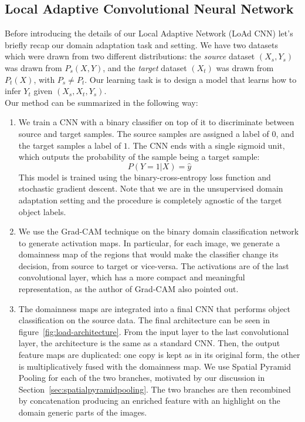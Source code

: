 \documentclass[../main.tex]{subfiles}
\begin{document}
    \subsection{Local Adaptive Convolutional Neural Network}
    Before introducing the details of our Local Adaptive Network (LoAd CNN) let's briefly recap our domain adaptation task and setting.
    We have two datasets which were drawn
    from two different distributions: the \textit{source} dataset $(X_{s}, Y_{s})$ was drawn from $P_{s}(X, Y)$, and the \textit{target}
    dataset $(X_{t})$ was drawn from $P_{t}(X)$, with $P_{s} \neq P_{t}$. Our learning task is to design a model that learns how to infer
    $Y_{t}$ given $(X_{s}, X_{t}, Y_{s})$. \\
    Our method can be summarized in the following way:
    \begin{enumerate}
        \item We train a CNN with a binary classifier on top of it to discriminate between source and target samples. The source samples are
            assigned a label of $0$, and the target samples a label of $1$. The CNN ends with a single sigmoid unit, which outputs the
            probability of the sample being a target sample:
            $$ P(Y = 1 | X) = \hat{y} $$
            This model is trained using the binary-cross-entropy loss function and stochastic gradient descent. Note that we are in the unsupervised
            domain adaptation setting and the procedure is completely agnostic of the target object labels.
        \item We use the Grad-CAM technique on the binary domain classification network to generate activation maps\@. In particular,
            for each image, we generate a domainness map of the regions that would make the classifier change its decision, from source to target or
            vice-versa. The activations are of the last convolutional layer, which has a more compact and meaningful representation, as the author
            of Grad-CAM also pointed out.
        \item The domainness maps are integrated into a final CNN that performs object classification on the source data. The final architecture can be seen in figure~\ref{fig:load-architecture}.
            From the input layer to the last convolutional layer, the architecture is the same as a standard CNN\@. Then, the output
            feature maps are duplicated: one copy is kept as in its original form, the other is multiplicatively fused with the domainness map.
            We use Spatial Pyramid Pooling for each of the two branches, motivated by our discussion in Section~\ref{sec:spatialpyramidpooling}.
            The two branches are then recombined by concatenation producing an enriched feature with an highlight on the domain generic parts of the images.
    \end{enumerate}
\end{document}
